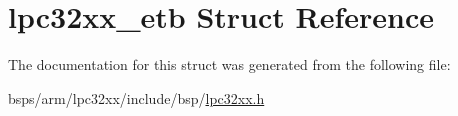 \hypertarget{structlpc32xx__etb}{}\section{lpc32xx\+\_\+etb Struct Reference}
\label{structlpc32xx__etb}


The documentation for this struct was generated from the following file\+:\begin{DoxyCompactItemize}
\item 
bsps/arm/lpc32xx/include/bsp/\mbox{\hyperlink{lpc32xx_8h}{lpc32xx.\+h}}\end{DoxyCompactItemize}
